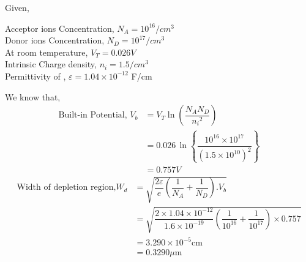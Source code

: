 \documentclass[a4aper,12pt]{report}
\begin{document}
\begin{tcolorbox}[breakable, title={\textbf{Example 1.3: }Consider a silicon pn-junction at room temperature doped at $N_A=10^{16}/cm^3$ in the p-region and $N_D=10^{17}/cm^3$ in the n-region. Intrinsic carrier density is $1.5/cm^3$ at room temperature. Calculate the width of depletion region.}]
    Given,
    \begin{adjustwidth}{1cm}{5pt}
        Acceptor ions Concentration, $N_A =10^{16}/cm^3$ \\
        Donor ions Concentration, $N_D=10^{17}/cm^3$ \\
        At room temperature, $V_T = 0.026 V$ \\ 
        Intrinsic Charge density, $n_i = 1.5/cm^3$ \\
        Permittivity of , $\varepsilon = 1.04\times 10^{-12}$ F/cm 
    \end{adjustwidth}
    We know that,
    \begin{align*}
        \text{Built-in Potential, }V_b &= V_T\ln\left(\dfrac{N_AN_D}{{n_i}^2}\right) \\ 
        &=0.026\, \ln\left\{\dfrac{10^{16}\times 10^{17}}{(1.5\times 10^{10})^2}\right\} \\ 
        &= 0.757 V
    \end{align*}
    \begin{align*}
        \text{Width of depletion region,} W_d &= \sqrt{\dfrac{2\varepsilon}{e}\left(\dfrac{1}{N_A}+\dfrac{1}{N_D}\right).V_b} \\ 
        &= \sqrt{\dfrac{2\times 1.04\times 10^{-12}}{1.6\times 10^{-19}}\left(\dfrac{1}{10^{16}}+\dfrac{1}{10^{17}}\right)\times 0.757} \\
        &= 3.290\times 10^{-5}\text{cm} \\ 
        &= 0.3290 \mu\text{m}
    \end{align*}
\end{tcolorbox}
\end{document}
